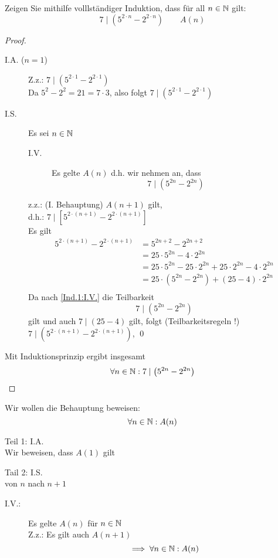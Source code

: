\documentclass{gadsescript}
\begin{document}
\begin{task}
	Zeigen Sie mithilfe volllständiger Induktion, dass für all $n \in \mathbb{N} $ gilt:
	\[ 7 \mid \left( 5^{2 \cdot n} - 2^{2 \cdot n} \right) \qquad A(n) \]
	\begin{proof}
		\begin{description}
			\item[I.A. ($n = 1$)] Z.z.: $ 7 \mid \left( 5^{2 \cdot 1} - 2^{2 \cdot 1} \right) $\\
				Da $ 5^2 - 2^2 = 21 = 7 \cdot 3 $, also folgt $ 7 \mid \left( 5^{2 \cdot 1} - 2^{2 \cdot 1} \right) $
			\item[I.S.] Es sei $ n \in \mathbb{N} $
				\begin{description}
					\item[I.V.] \label{Ind.1:I.V.} Es gelte $ A(n) $ d.h. wir nehmen an, dass
						\[ 7 \mid \left( 5^{2n} - 2^{2n} \right) \]
				\end{description}
				z.z.: (I. Behauptung) $ A( n + 1 ) $ gilt,\\
				d.h.: $ 7 \mid \left[ 5^{2 \cdot ( n + 1 )} - 2^{2 \cdot ( n + 1 )} \right] $\\
				Es gilt
				\begin{align*}
					5^{2 \cdot ( n + 1 )} - 2^{2 \cdot ( n + 1 )} &= 5^{2n + 2} - 2^{2n + 2}\\
						~&= 25 \cdot 5^{2n} - 4 \cdot 2^{2n}\\
						~&= 25 \cdot 5^{2n} - 25 \cdot 2^{2n} + 25 \cdot 2^{2n} - 4 \cdot 2^{2n}\\
						~&= 25 \cdot \left( 5^{2n} - 2^{2n} \right) + ( 25 - 4 ) \cdot 2^{2n}\\
				\end{align*}
				Da nach \ref{Ind.1:I.V.} die Teilbarkeit
				\[ 7 \mid \left( 5^{2n} - 2^{2n} \right) \]
				gilt und auch $ 7 \mid (25 - 4) $ gilt, folgt (Teilbarkeitsregeln !) $ 7 \mid \left( 5^{2 \cdot ( n + 1 )} - 2^{2 \cdot ( n + 1 )} \right) $, \qed
		\end{description}
		Mit Induktionsprinzip ergibt insgesamt
		\[ \forall n \in \mathbb{N} : 7 \mid \left( 5^{2n} - 2^{2n} \right) \]
	\end{proof}
\end{task}

\begin{definition}
	Wir wollen die Behauptung beweisen:
	\[ \forall n \in \mathbb{N} : A(n) \]\par
	Teil 1: I.A.\\
	Wir beweisen, dass $ A(1) $ gilt\par
	Tail 2: I.S.\\
	von $ n $ nach $ n + 1 $
	\begin{description}
		\item[I.V.:] Es gelte $ A(n) $ für $ n \in \mathbb{N} $\\
			Z.z.: Es gilt auch $ A( n + 1 ) $
			\[ \implies \forall n \in \mathbb{N} : A(n) \]
	\end{description}
\end{definition}
\end{document}
